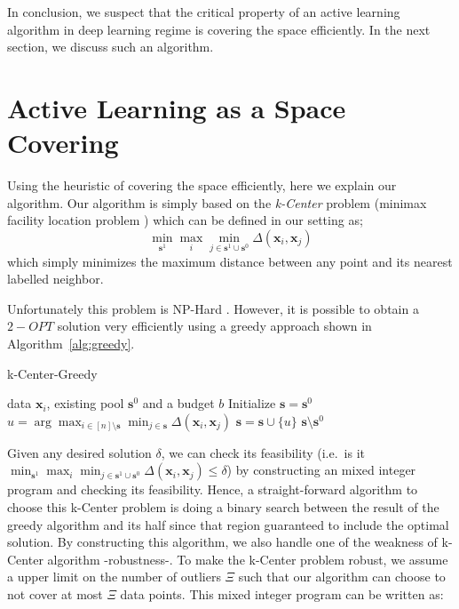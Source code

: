 \documentclass{article}
\begin{document}
In conclusion, we suspect that the critical property of an active learning algorithm in deep learning regime is covering the space efficiently. In the next section, we discuss such an algorithm.

\section{Active Learning as a Space Covering}
Using the heuristic of covering the space efficiently, here we explain our algorithm. Our algorithm is simply based on the \emph{k-Center} problem (minimax facility location problem \cite{facility}) which can be defined in our setting as;
\begin{equation}
\min_{\mathbf{s}^1} \max_i \min_{j \in \mathbf{s}^1 \cup \mathbf{s}^0} \Delta(\mathbf{x}_i,\mathbf{x}_j)
\end{equation}
which simply minimizes the maximum distance between any point and its nearest labelled neighbor. 

Unfortunately this problem is NP-Hard \cite{cook}. However, it is possible to obtain a $2-OPT$ solution very efficiently using a greedy approach shown in  Algorithm~\ref{alg:greedy}.

\begin{algorithm}[ht]
   \caption{k-Center-Greedy}
   \label{alg:greedy}
\begin{algorithmic}
    data $\mathbf{x}_i$, existing pool $\mathbf{s}^0$ and a budget $b$
    \STATE Initialize $\mathbf{s}=\mathbf{s}^0$
   \REPEAT
   \STATE $u=\arg\max_{i \in [n] \setminus \mathbf{s}} \min_{j \in \mathbf{s}} \Delta(\mathbf{x}_i, \mathbf{x}_j)$
   \STATE $\mathbf{s} = \mathbf{s} \cup \{u\}$
    $\mathbf{s} \setminus \mathbf{s}^0$
\end{algorithmic}
\end{algorithm}

Given any desired solution $\delta$, we can check its feasibility (i.e.\ is it $\min_{\mathbf{s}^1} \max_i \min_{j \in \mathbf{s}^1 \cup \mathbf{s}^0} \Delta(\mathbf{x}_i,\mathbf{x}_j) \leq \delta$) by constructing an mixed integer program and checking its feasibility. Hence, a straight-forward algorithm to choose this k-Center problem is doing a binary search between the result of the greedy algorithm and its half since that region guaranteed to include the optimal solution. By constructing this algorithm, we also handle one of the weakness of k-Center algorithm -robustness-. To make the k-Center problem robust, we assume a upper limit on the number of outliers $\Xi$ such that our algorithm can choose to not cover at most $\Xi$ data points. This mixed integer program can be written as:
\end{document}
